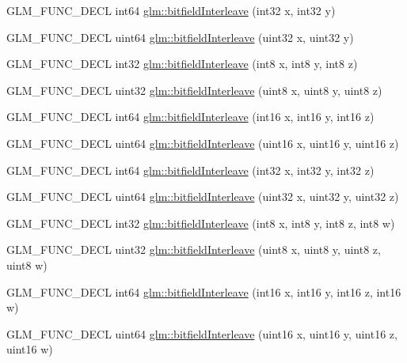 \begin{DoxyCompactItemize}
G\-L\-M\-\_\-\-F\-U\-N\-C\-\_\-\-D\-E\-C\-L int64 \hyperlink{group__gtx__bit_ga0de51d5985e6a703f305a5a61479babd}{glm\-::bitfield\-Interleave} (int32 x, int32 y)
\item 
G\-L\-M\-\_\-\-F\-U\-N\-C\-\_\-\-D\-E\-C\-L uint64 \hyperlink{group__gtx__bit_ga2bc87fd66f6f8471c1a46888360cef12}{glm\-::bitfield\-Interleave} (uint32 x, uint32 y)
\item 
G\-L\-M\-\_\-\-F\-U\-N\-C\-\_\-\-D\-E\-C\-L int32 \hyperlink{group__gtx__bit_ga6dee2ce1c45805063bb7fc5f6fd8f5ca}{glm\-::bitfield\-Interleave} (int8 x, int8 y, int8 z)
\item 
G\-L\-M\-\_\-\-F\-U\-N\-C\-\_\-\-D\-E\-C\-L uint32 \hyperlink{group__gtx__bit_gab9d593a2e916beb8f8137a0dbeae3afe}{glm\-::bitfield\-Interleave} (uint8 x, uint8 y, uint8 z)
\item 
G\-L\-M\-\_\-\-F\-U\-N\-C\-\_\-\-D\-E\-C\-L int64 \hyperlink{group__gtx__bit_gaf898f842ac089fcc8d6201c32702584a}{glm\-::bitfield\-Interleave} (int16 x, int16 y, int16 z)
\item 
G\-L\-M\-\_\-\-F\-U\-N\-C\-\_\-\-D\-E\-C\-L uint64 \hyperlink{group__gtx__bit_ga3c170e2ec54f2faab5e1c5bb693d718d}{glm\-::bitfield\-Interleave} (uint16 x, uint16 y, uint16 z)
\item 
G\-L\-M\-\_\-\-F\-U\-N\-C\-\_\-\-D\-E\-C\-L int64 \hyperlink{group__gtx__bit_ga64e2d84f6560af3cc639644b1e628c42}{glm\-::bitfield\-Interleave} (int32 x, int32 y, int32 z)
\item 
G\-L\-M\-\_\-\-F\-U\-N\-C\-\_\-\-D\-E\-C\-L uint64 \hyperlink{group__gtx__bit_ga7c10eb37f608365cfaef5ca2c476e1ce}{glm\-::bitfield\-Interleave} (uint32 x, uint32 y, uint32 z)
\item 
G\-L\-M\-\_\-\-F\-U\-N\-C\-\_\-\-D\-E\-C\-L int32 \hyperlink{group__gtx__bit_ga7da84ecc2b3a46c9c08a9f40012359cf}{glm\-::bitfield\-Interleave} (int8 x, int8 y, int8 z, int8 w)
\item 
G\-L\-M\-\_\-\-F\-U\-N\-C\-\_\-\-D\-E\-C\-L uint32 \hyperlink{group__gtx__bit_ga447c0bbed9d60c14578626d8f03f3755}{glm\-::bitfield\-Interleave} (uint8 x, uint8 y, uint8 z, uint8 w)
\item 
G\-L\-M\-\_\-\-F\-U\-N\-C\-\_\-\-D\-E\-C\-L int64 \hyperlink{group__gtx__bit_ga09ee0be0fac790a1607a711e597dd9bf}{glm\-::bitfield\-Interleave} (int16 x, int16 y, int16 z, int16 w)
\item 
G\-L\-M\-\_\-\-F\-U\-N\-C\-\_\-\-D\-E\-C\-L uint64 \hyperlink{group__gtx__bit_gac8a926a7bfd9b23c22a4f685193fbfe1}{glm\-::bitfield\-Interleave} (uint16 x, uint16 y, uint16 z, uint16 w)
\end{DoxyCompactItemize}



